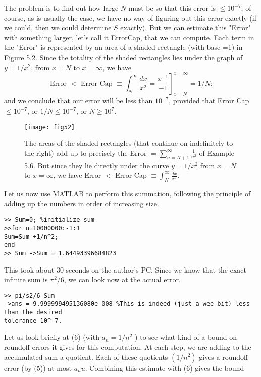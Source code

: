 \documentclass[../main.tex]{subfiles}
\begin{document}
The problem is to find out how large $N$ must be so that this error is $\leq 10^{-7}$; of course, as is usually the case, we have no way of figuring out this error exactly (if we could, then we could determine $S$ exactly). But we can estimate this "Error" with something larger, let's call it ErrorCap, that we can compute. Each term in the "Error" is represented by an area of a shaded rectangle (with base =1) in Figure 5.2. Since the totality of the shaded rectangles lies under the graph of $y=1 / x^{2}$, from $x=N$ to $x=\infty$, we have
$$
\text { Error } \left.<\text { Error Cap } \equiv \int_{N}^{\infty} \frac{d x}{x^{2}}=\frac{x^{-1}}{-1}\right]_{x=N}^{x=\infty}=1 / N \text {; }
$$
and we conclude that our error will be less than $10^{-7}$, provided that Error Cap $\leq 10^{-7}$, or $1 / N \leq 10^{-7}$, or $N \geq 10^{7}$.


\begin{figure}[H]
\centering
\texttt{[image: fig52]}
\caption{The areas of the shaded rectangles (that continue on indefinitely to the right) add up to precisely the Error $=\sum_{n=N+1}^{\infty} \frac{1}{n^{2}}$ of Example 5.6. But since they lie directly under the curve $y=1 / x^{2}$ from $x=N$ to $x=\infty$, we have Error $<$ Error Cap $\equiv \int_{N}^{\infty} \frac{d x}{x^{2}}$. }
\label{fig:fig_5_2}
\end{figure}

Let us now use MATLAB to perform this summation, following the principle of adding up the numbers in order of increasing size.

\begin{verbatim}
>> Sum=0; %initialize sum
>>for n=10000000:-1:1
Sum=Sum +1/n^2;
end
>> Sum ->Sum = 1.64493396684823 

\end{verbatim}

This took about 30 seconds on the author's PC. Since we know that the exact infinite sum is $\pi^{2} / 6$, we can look now at the actual error.

\begin{verbatim}
>> pi/s2/6-Sum
->ans = 9.999999495136080e-008 %This is indeed (just a wee bit) less than the desired
tolerance 10^-7. 
\end{verbatim}

 Let us look briefly at (6) (with $a_{n}=1 / n^{2}$ ) to see what kind of a bound on roundoff errors it gives for this computation. At each step, we are adding to the accumulated sum a quotient. Each of these quotients $\left(1 / n^{2}\right)$ gives a roundoff error (by (5)) at most $a_{n} u$. Combining this estimate with (6) gives the bound
 
\end{document}
